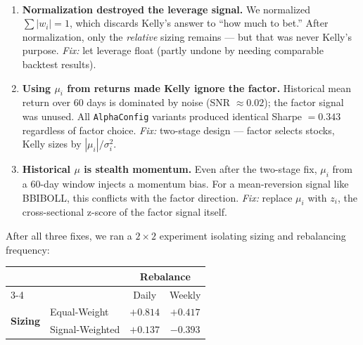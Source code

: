\documentclass[a4paper, 11pt]{report}
\theoremstyle{definition}
\theoremstyle{remark}
\begin{document}
\begin{description}[style=nextline, leftmargin=1.8cm]
    \item[The Three Bugs We Hit (and Fixed)]~
        \begin{enumerate}[nosep]
            \item \textbf{Normalization destroyed the leverage signal.}
                  We normalized $\sum|w_i| = 1$, which discards Kelly's
                  answer to ``how much to bet.''  After normalization,
                  only the \emph{relative} sizing remains --- but that
                  was never Kelly's purpose.
                  \emph{Fix:} let leverage float (partly undone by
                  needing comparable backtest results).
            \item \textbf{Using $\mu_i$ from returns made Kelly ignore
                  the factor.}
                  Historical mean return over 60 days is dominated by
                  noise (SNR $\approx 0.02$); the factor signal was
                  unused.  All \texttt{AlphaConfig} variants produced
                  identical Sharpe $= 0.343$ regardless of factor
                  choice.
                  \emph{Fix:} two-stage design --- factor selects
                  stocks, Kelly sizes by $|\mu_i| / \sigma_i^2$.
            \item \textbf{Historical $\mu$ is stealth momentum.}
                  Even after the two-stage fix, $\mu_i$ from a 60-day
                  window injects a momentum bias.  For a mean-reversion
                  signal like BBIBOLL, this conflicts with the factor
                  direction.
                  \emph{Fix:} replace $\mu_i$ with $z_i$, the
                  cross-sectional z-score of the factor signal itself.
        \end{enumerate}

    \item[The Ablation Study]
        After all three fixes, we ran a $2 \times 2$ experiment
        isolating sizing and rebalancing frequency:
        \begin{center}
        \begin{tabular}{@{}llcc@{}}
        \toprule
        & & \multicolumn{2}{c}{\textbf{Rebalance}} \\
        \cmidrule(l){3-4}
        & & Daily & Weekly \\
        \midrule
        \multirow{2}{*}{\textbf{Sizing}}
        & Equal-Weight      & $+0.814$ & $+0.417$ \\
        & Signal-Weighted   & $+0.137$ & $-0.393$ \\
        \bottomrule
        \end{tabular}
        \end{center}


\end{description}
\end{document}

